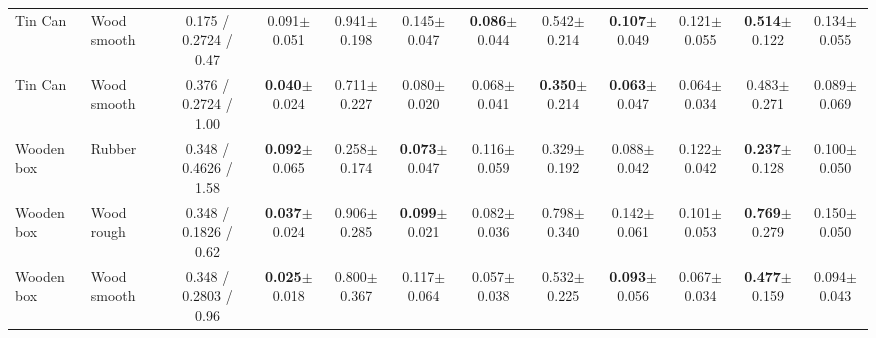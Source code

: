 \begin{table}[t]
{\begin{tabular}{l l c c c c c c c c c c }
        Tin Can & Wood smooth & 0.175 / 0.2724 / 0.47 & 0.091$\pm$0.051 & 0.941$\pm$0.198 & 0.145$\pm$0.047 & \textbf{0.086}$\pm$0.044 & 0.542$\pm$0.214 & \textbf{0.107}$\pm$0.049 & 0.121$\pm$0.055 & \textbf{0.514}$\pm$0.122 & 0.134$\pm$0.055 \\
        Tin Can & Wood smooth & 0.376 / 0.2724 / 1.00 & \textbf{0.040}$\pm$0.024 & 0.711$\pm$0.227 & 0.080$\pm$0.020 & 0.068$\pm$0.041 & \textbf{0.350}$\pm$0.214 & \textbf{0.063}$\pm$0.047 & 0.064$\pm$0.034 & 0.483$\pm$0.271 & 0.089$\pm$0.069 \\
        Wooden box & Rubber & 0.348 / 0.4626 / 1.58 & \textbf{0.092}$\pm$0.065 & 0.258$\pm$0.174 & \textbf{0.073}$\pm$0.047 & 0.116$\pm$0.059 & 0.329$\pm$0.192 & 0.088$\pm$0.042 & 0.122$\pm$0.042 & \textbf{0.237}$\pm$0.128 & 0.100$\pm$0.050 \\
        Wooden box & Wood rough & 0.348 / 0.1826 / 0.62 & \textbf{0.037}$\pm$0.024 & 0.906$\pm$0.285 & \textbf{0.099}$\pm$0.021 & 0.082$\pm$0.036 & 0.798$\pm$0.340 & 0.142$\pm$0.061 & 0.101$\pm$0.053 & \textbf{0.769}$\pm$0.279 & 0.150$\pm$0.050 \\
        Wooden box & Wood smooth & 0.348 / 0.2803 / 0.96 & \textbf{0.025}$\pm$0.018 & 0.800$\pm$0.367 & 0.117$\pm$0.064 & 0.057$\pm$0.038 & 0.532$\pm$0.225 & \textbf{0.093}$\pm$0.056 & 0.067$\pm$0.034 & \textbf{0.477}$\pm$0.159 & 0.094$\pm$0.043 \\
        \bottomrule
    \end{tabular}
    }
\end{table}
